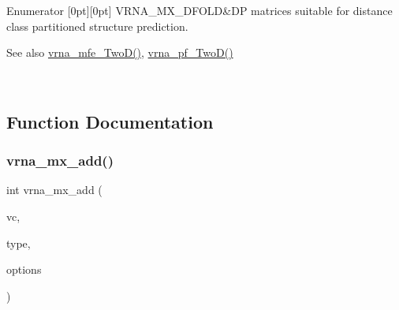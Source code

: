 \begin{DoxyEnumFields}{Enumerator}
[0pt][0pt]{}\mbox{\label{group__dp__matrices_gga6042ea1d58d01931e959791be6d89343ae656f8391445ff71bed8a597a0a19417}} 
V\+R\+N\+A\+\_\+\+M\+X\+\_\+D\+F\+O\+LD&DP matrices suitable for distance class partitioned structure prediction. \begin{DoxySeeAlso}{See also}
\mbox{\hyperlink{group__kl__neighborhood__mfe_ga243c288b463147352829df04de6a2f77}{vrna\+\_\+mfe\+\_\+\+Two\+D()}}, \mbox{\hyperlink{group__kl__neighborhood__pf_ga0bc3427689bd09da09b8b3094a27f836}{vrna\+\_\+pf\+\_\+\+Two\+D()}} 
\end{DoxySeeAlso}
\\
\hline

\end{DoxyEnumFields}


\subsection{Function Documentation}
\mbox{\label{group__dp__matrices_ga08661f098008961dab0023bf300f0c33}} 
\subsubsection{\texorpdfstring{vrna\+\_\+mx\+\_\+add()}{vrna\_mx\_add()}}
{\footnotesize\ttfamily int vrna\+\_\+mx\+\_\+add (\begin{DoxyParamCaption}\item[{\mbox{\hyperlink{group__fold__compound_ga1b0cef17fd40466cef5968eaeeff6166}{vrna\+\_\+fold\+\_\+compound\+\_\+t}} $\ast$}]{vc,  }\item[{\mbox{\hyperlink{group__dp__matrices_ga6042ea1d58d01931e959791be6d89343}{vrna\+\_\+mx\+\_\+type\+\_\+e}}}]{type,  }\item[{unsigned int}]{options }\end{DoxyParamCaption})}



